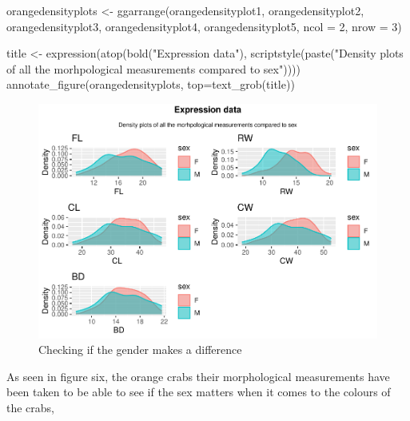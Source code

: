 \documentclass[
]{article}
\newenvironment{Shaded}{}{}
\newcommand{\AttributeTok}[1]{#1}
\newcommand{\DecValTok}[1]{#1}
\newcommand{\FunctionTok}[1]{#1}
\newcommand{\NormalTok}[1]{#1}
\newcommand{\OtherTok}[1]{\textcolor[rgb]{1.00,0.25,0.00}{#1}}
\newcommand{\StringTok}[1]{\textcolor[rgb]{0.00,0.50,0.50}{#1}}
\begin{document}
\begin{Shaded}
\begin{Highlighting}[]
\NormalTok{orangedensityplots }\OtherTok{\textless{}{-}} \FunctionTok{ggarrange}\NormalTok{(orangedensityplot1, orangedensityplot2, orangedensityplot3,}
\NormalTok{                                orangedensityplot4, orangedensityplot5, }\AttributeTok{ncol =} \DecValTok{2}\NormalTok{, }\AttributeTok{nrow =} \DecValTok{3}\NormalTok{)}

\NormalTok{title }\OtherTok{\textless{}{-}} \FunctionTok{expression}\NormalTok{(}\FunctionTok{atop}\NormalTok{(}\FunctionTok{bold}\NormalTok{(}\StringTok{"Expression data"}\NormalTok{), }
        \FunctionTok{scriptstyle}\NormalTok{(}\FunctionTok{paste}\NormalTok{(}\StringTok{"Density plots of all the morhpological measurements compared to sex"}\NormalTok{))))}
\FunctionTok{annotate\_figure}\NormalTok{(orangedensityplots,}
                \AttributeTok{top=}\FunctionTok{text\_grob}\NormalTok{(title))}
\end{Highlighting}
\end{Shaded}

\begin{figure}[H]

{\centering \includegraphics{Log_files/figure-latex/figure6-1} 

}

\caption{Checking if the gender makes a difference}\label{fig:figure6}
\end{figure}

As seen in figure six, the orange crabs their morphological measurements
have been taken to be able to see if the sex matters when it comes to
the colours of the crabs,
\end{document}
